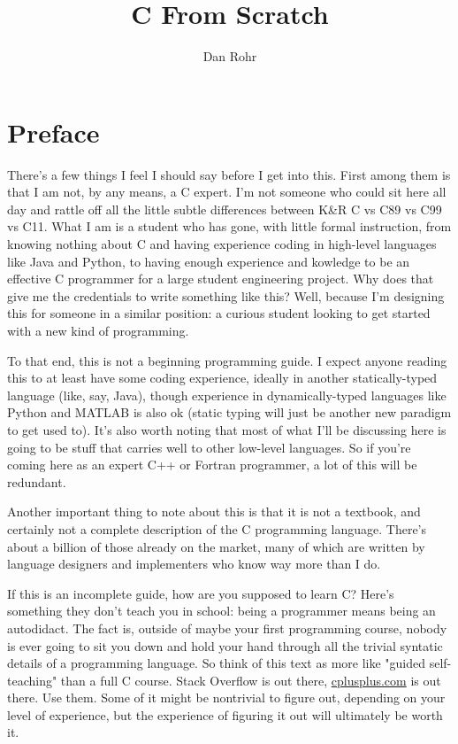 \documentclass[ebook,11pt,oneside,openany]{memoir}
\title{C From Scratch}
\author{Dan Rohr}
\begin{document}
\maketitle

\chapter*{Preface}

There's a few things I feel I should say before I get into this. First among them is that I am not, by any means, a C expert. I'm not someone who could sit here all day and rattle off all the little subtle differences between K\&R C vs C89 vs C99 vs C11. What I am is a student who has gone, with little formal instruction, from knowing nothing about C and having experience coding in high-level languages like Java and Python, to having enough experience and kowledge to be an effective C programmer for a large student engineering project. Why does that give me the credentials to write something like this? Well, because I'm designing this for someone in a similar position: a curious student looking to get started with a new kind of programming.

To that end, this is not a beginning programming guide. I expect anyone reading this to at least have some coding experience, ideally in another statically-typed language (like, say, Java), though experience in dynamically-typed languages like Python and MATLAB is also ok (static typing will just be another new paradigm to get used to). It's also worth noting that most of what I'll be discussing here is going to be stuff that carries well to other low-level languages. So if you're coming here as an expert C++ or Fortran programmer, a lot of this will be redundant.

Another important thing to note about this is that it is not a textbook, and certainly not a complete description of the C programming language. There's about a billion of those already on the market, many of which are written by language designers and implementers who know way more than I do.

If this is an incomplete guide, how are you supposed to learn C? Here's something they don't teach you in school: being a programmer means being an autodidact. The fact is, outside of maybe your first programming course,  nobody is ever going to sit you down and hold your hand through all the trivial syntatic details of a programming language. So think of this text as more like "guided self-teaching" than a full C course. Stack Overflow is out there, \url{cplusplus.com} is out there. Use them. Some of it might be nontrivial to figure out, depending on your level of experience, but the experience of figuring it out will ultimately be worth it.
\end{document}

